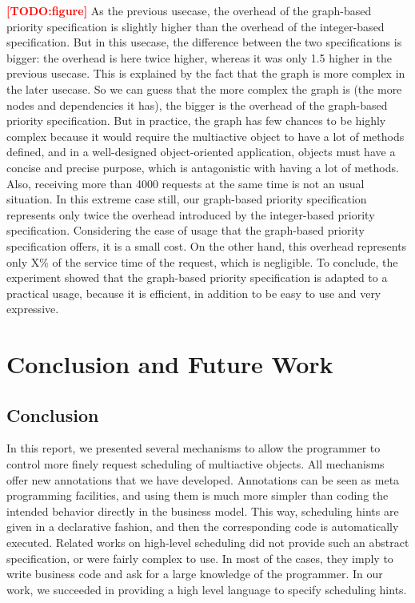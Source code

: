 \documentclass[11pt]{report}
\newcommand{\TODO}[1]{\textcolor{red}{\textbf{[TODO:#1]}}}
\begin{document}
\TODO{figure}
As the previous usecase, the overhead of the graph-based priority specification is slightly higher than the overhead of the integer-based specification. But in this usecase, the difference between the two specifications is bigger: the overhead is here twice higher, whereas it was only 1.5 higher in the previous usecase.
This is explained by the fact that the graph is more complex in the later usecase. So we can guess that the more complex the graph is (the more nodes and dependencies it has), the bigger is the overhead of the graph-based priority specification.
But in practice, the graph has few chances to be highly complex because it would require the multiactive object to have a lot of methods defined, and in a well-designed object-oriented application, objects must have a concise and precise purpose, which is antagonistic with having a lot of methods. Also, receiving more than 4000 requests at the same time is not an usual situation. In this extreme case still, our graph-based priority specification represents only twice the overhead introduced by the integer-based priority specification. Considering the ease of usage that the graph-based priority specification offers, it is a small cost. On the other hand, this overhead represents only X\% of the service time of the request, which is negligible. To conclude, the experiment showed that the graph-based priority specification is adapted to a practical usage, because it is efficient, in addition to be easy to use and very expressive. 


\chapter{Conclusion and Future Work} 
\section{Conclusion}
In this report, we presented several mechanisms to allow the programmer to control more finely request scheduling of multiactive objects. All mechanisms offer new annotations that we have developed. Annotations can be seen as meta programming facilities, and using them is much more simpler than coding the intended behavior directly in the business model. This way, scheduling hints are given in a declarative fashion, and then the corresponding code is automatically executed. Related works on high-level scheduling did not provide such an abstract specification, or were fairly complex to use. In most of the cases, they imply to write business code and ask for a large knowledge of the programmer. In our work, we succeeded in providing a high level language to specify scheduling hints.
\end{document}
